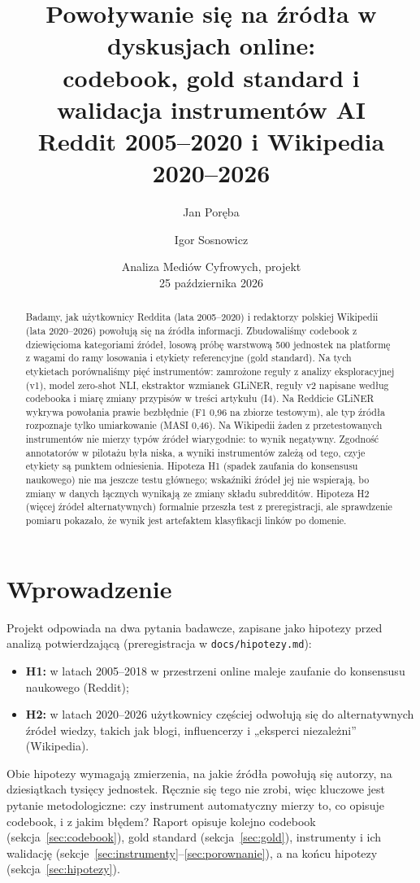 \documentclass[11pt,a4paper]{article}
\title{Powoływanie się na źródła w dyskusjach online:\\codebook, gold standard i walidacja instrumentów AI\\
\large Reddit 2005--2020 i Wikipedia 2020--2026}
\author{Jan Poręba \and Igor Sosnowicz}
\date{Analiza Mediów Cyfrowych, projekt \kod{digital-media-analysis}\\25 października 2026}
\newcommand{\kod}[1]{\texttt{#1}}
\begin{document}
\maketitle

\begin{abstract}
Badamy, jak użytkownicy Reddita (lata 2005--2020) i redaktorzy polskiej Wikipedii (lata 2020--2026) powołują się na źródła informacji. Zbudowaliśmy codebook z dziewięcioma kategoriami źródeł, losową próbę warstwową 500 jednostek na platformę z wagami do ramy losowania i etykiety referencyjne (gold standard). Na tych etykietach porównaliśmy pięć instrumentów: zamrożone reguły z analizy eksploracyjnej (v1), model zero-shot NLI, ekstraktor wzmianek GLiNER, reguły v2 napisane według codebooka i miarę zmiany przypisów w treści artykułu (I4). Na Reddicie GLiNER wykrywa powołania prawie bezbłędnie (F1 0,96 na zbiorze testowym), ale typ źródła rozpoznaje tylko umiarkowanie (MASI 0,46). Na Wikipedii żaden z przetestowanych instrumentów nie mierzy typów źródeł wiarygodnie: to wynik negatywny. Zgodność annotatorów w pilotażu była niska, a wyniki instrumentów zależą od tego, czyje etykiety są punktem odniesienia. Hipoteza H1 (spadek zaufania do konsensusu naukowego) nie ma jeszcze testu głównego; wskaźniki źródeł jej nie wspierają, bo zmiany w danych łącznych wynikają ze zmiany składu subredditów. Hipoteza H2 (więcej źródeł alternatywnych) formalnie przeszła test z preregistracji, ale sprawdzenie pomiaru pokazało, że wynik jest artefaktem klasyfikacji linków po domenie.
\end{abstract}

\section{Wprowadzenie}

Projekt odpowiada na dwa pytania badawcze, zapisane jako hipotezy przed analizą potwierdzającą (preregistracja w \kod{docs/hipotezy.md}):
\begin{itemize}
  \item \textbf{H1:} w latach 2005--2018 w przestrzeni online maleje zaufanie do konsensusu naukowego (Reddit);
  \item \textbf{H2:} w latach 2020--2026 użytkownicy częściej odwołują się do alternatywnych źródeł wiedzy, takich jak blogi, influencerzy i „eksperci niezależni” (Wikipedia).
\end{itemize}
Obie hipotezy wymagają zmierzenia, na jakie źródła powołują się autorzy, na dziesiątkach tysięcy jednostek. Ręcznie się tego nie zrobi, więc kluczowe jest pytanie metodologiczne: czy instrument automatyczny mierzy to, co opisuje codebook, i z jakim błędem? Raport opisuje kolejno codebook (sekcja~\ref{sec:codebook}), gold standard (sekcja~\ref{sec:gold}), instrumenty i ich walidację (sekcje~\ref{sec:instrumenty}--\ref{sec:porownanie}), a na końcu hipotezy (sekcja~\ref{sec:hipotezy}).
\end{document}
